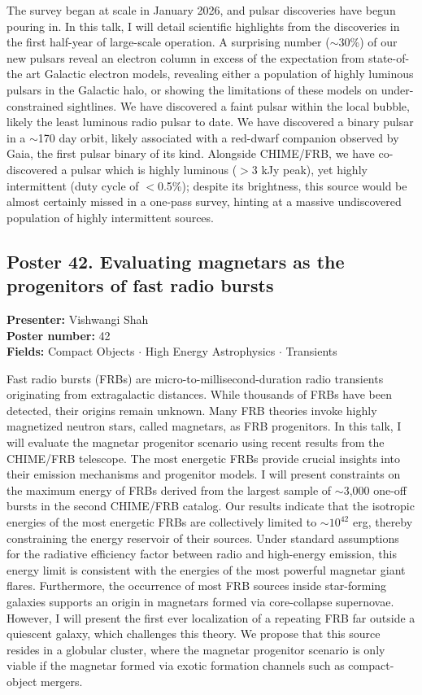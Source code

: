 The survey began at scale in January 2026, and pulsar discoveries have begun pouring in. In this talk, I will detail scientific highlights from the discoveries in the first half-year of large-scale operation. A surprising number ($\sim$30\%) of our new pulsars reveal an electron column in excess of the expectation from state-of-the art Galactic electron models, revealing either a population of highly luminous pulsars in the Galactic halo, or showing the limitations of these models on under-constrained sightlines. We have discovered a faint pulsar within the local bubble, likely the least luminous radio pulsar to date. We have discovered a binary pulsar in a $\sim$170 day orbit, likely associated with a red-dwarf companion observed by Gaia, the first pulsar binary of its kind. Alongside CHIME/FRB, we have co-discovered a pulsar which is highly luminous ($>$3 kJy peak), yet highly intermittent (duty cycle of $<$0.5\%); despite its brightness, this source would be almost certainly missed in a one-pass survey, hinting at a massive undiscovered population of highly intermittent sources.

\hypertarget{poster-abstract-talk-174}{}\label{poster-abstract-page-talk-174}
\subsection*{Poster 42. Evaluating magnetars as the progenitors of fast radio bursts}
\textbf{Presenter:} Vishwangi Shah\\
\textbf{Poster number:} 42\\
\textbf{Fields:} Compact Objects $\cdot$ High Energy Astrophysics $\cdot$ Transients

Fast radio bursts (FRBs) are micro-to-millisecond-duration radio transients originating from extragalactic distances. While thousands of FRBs have been detected, their origins remain unknown. Many FRB theories invoke highly magnetized neutron stars, called magnetars, as FRB progenitors. In this talk, I will evaluate the magnetar progenitor scenario using recent results from the CHIME/FRB telescope. The most energetic FRBs provide crucial insights into their emission mechanisms and progenitor models. I will present constraints on the maximum energy of FRBs derived from the largest sample of $\sim$3,000 one-off bursts in the second CHIME/FRB catalog. Our results indicate that the isotropic energies of the most energetic FRBs are collectively limited to $\sim 10^{42}$ erg, thereby constraining the energy reservoir of their sources. Under standard assumptions for the radiative efficiency factor between radio and high-energy emission, this energy limit is consistent with the energies of the most powerful magnetar giant flares. Furthermore, the occurrence of most FRB sources inside star-forming galaxies supports an origin in magnetars formed via core-collapse supernovae. However, I will present the first ever localization of a repeating FRB far outside a quiescent galaxy, which challenges this theory. We propose that this source resides in a globular cluster, where the magnetar progenitor scenario is only viable if the magnetar formed via exotic formation channels such as compact-object mergers.


